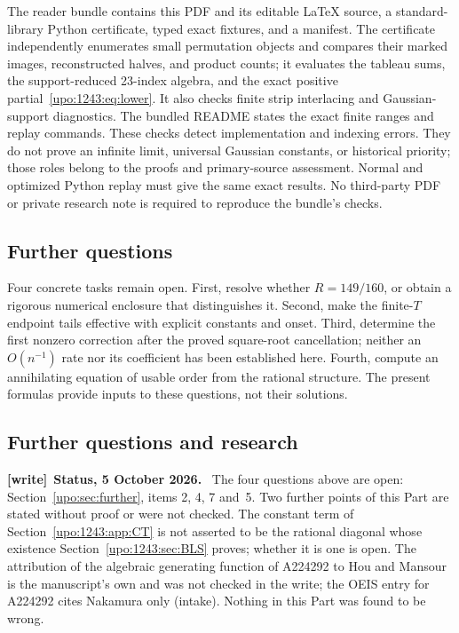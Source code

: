 \documentclass[11pt,letterpaper]{article}
\theoremstyle{remark}\newtheorem{remark}[theorem]{Remark}
\numberwithin{equation}{section}
\newenvironment{writenote}[1][]{\par\smallskip\begingroup\small
 \noindent\textbf{[write]}\if\relax\detokenize{#1}\relax\else~\textbf{#1.}\fi\ }%
 {\par\endgroup\smallskip}
\begin{document}
The reader bundle contains this PDF and its editable LaTeX source,
a standard-library Python certificate, typed exact fixtures, and a
manifest. The certificate independently enumerates small permutation
objects and compares their marked images, reconstructed halves, and
product counts; it evaluates the tableau sums, the support-reduced
23-index algebra, and the exact positive partial~\eqref{upo:1243:eq:lower}.
It also checks finite strip interlacing and Gaussian-support diagnostics.
The bundled README states the exact finite ranges and replay commands.
These checks detect implementation and indexing errors. They do not
prove an infinite limit, universal Gaussian constants, or historical
priority; those roles belong to the proofs and primary-source assessment.
Normal and optimized Python replay must give the same exact results.
No third-party PDF or private research note is required to reproduce the
bundle's checks.

\subsection*{Further questions}
Four concrete tasks remain open. First, resolve whether $R=149/160$, or
obtain a rigorous numerical enclosure that distinguishes it. Second,
make the finite-$T$ endpoint tails effective with explicit constants and
onset. Third, determine the first nonzero correction after the proved
square-root cancellation; neither an $O(n^{-1})$ rate nor its coefficient
has been established here. Fourth, compute an annihilating equation of
usable order from the rational structure. The present formulas provide
inputs to these questions, not their solutions.
\subsection{Further questions and research}\label{upo:1243:sub:further}
\begin{writenote}[Status, 5 October 2026]
The four questions above are open: Section~\ref{upo:sec:further}, items 2, 4, 7 and~5. Two further points of this Part are stated without proof or were not checked. The constant term of Section~\ref{upo:1243:app:CT} is not asserted to be the rational diagonal whose existence Section~\ref{upo:1243:sec:BLS} proves; whether it is one is open. The attribution of the algebraic generating function of A224292 to Hou and Mansour \cite[Example 6 and Theorem 7]{HM} is the manuscript's own and was not checked in the write; the OEIS entry for A224292 cites Nakamura only (intake). Nothing in this Part was found to be wrong.
\end{writenote}
\end{document}
